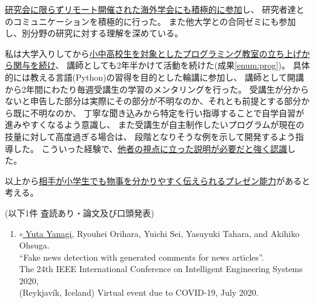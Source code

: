 \underline{研究会に限らずリモート開催された海外学会にも積極的に参加}し、
研究者達とのコミュニケーションを積極的に行った。
また他大学との合同ゼミにも参加し、別分野の研究に対する理解を深めている。

私は大学入りしてから\underline{小中高校生を対象としたプログラミング教室の立ち上げから関与を続け}、
講師としても2年半かけて活動を続けた(成果\ref{enum:prog})。
具体的には教える言語(Python)の習得を目的とした輪講に参加し、
講師として開講から2年間にわたり毎週受講生の学習のメンタリングを行った。
受講生が分からないと申告した部分は実際にその部分が不明なのか、それとも前提とする部分から既に不明なのか、
丁寧な聞き込みから特定を行い指導することで自学自習が進みやすくなるよう意識し、
また受講生が自主制作したいプログラムが現在の技量に対して高度過ぎる場合は、
段階となりそうな例を示して開発するよう指導した。
こういった経験で、\underline{他者の視点に立った説明が必要だと強く認識}した。

以上から\underline{相手が小学生でも物事を分かりやすく伝えられるプレゼン能力}があると考える。

(以下1件 査読あり・論文及び口頭発表)
\vspace{-4mm}
\begin{enumerate}
    \setlength{\parskip}{0cm}
    \setlength{\itemsep}{0cm}
    \item \underline{$\circ$ Yuta Yanagi}, Ryouhei Orihara, Yuichi Sei, Yasuyuki Tahara, and Akihiko Ohsuga.\\
    ``Fake news detection with generated comments for news articles''.\\
    The 24th IEEE International Conference on Intelligent Engineering Systems 2020,\\
    (Reykjavík, Iceland) Virtual event due to COVID-19, July 2020. \label{enum:ines}
\end{enumerate}

